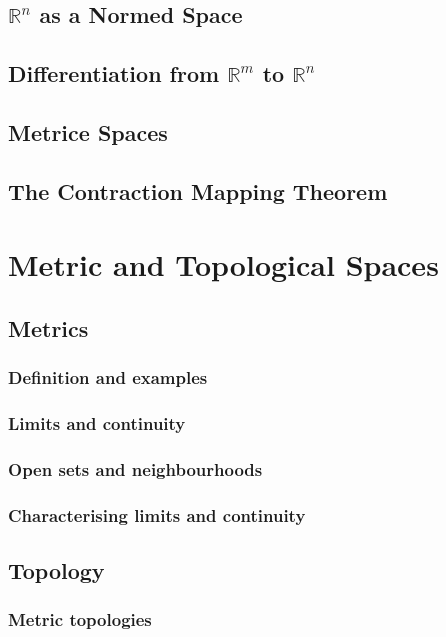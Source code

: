 \documentclass[12pt]{book}
\newcommand{\RR}{\mathbb R}
\theoremstyle{definition}
\theoremstyle{remark}
\begin{document}
		\section{$\RR^n$ as a Normed Space}
		
		\section{Differentiation from $\RR^m$ to $\RR^n$}
		
		\section{Metrice Spaces}
		
		\section{The Contraction Mapping Theorem}
		
	\chapter{Metric and Topological Spaces}
		\section{Metrics}
			\subsection{Definition and examples}
			
			\subsection{Limits and continuity}
			
			\subsection{Open sets and neighbourhoods}
			
			\subsection{Characterising limits and continuity}
			
		\section{Topology}
			\subsection{Metric topologies}
			
\end{document}
